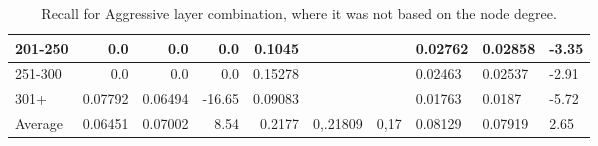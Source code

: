 \begin{table*}[]
\begin{tabular}{|l|r|r|r||r|r|r||l|l|l|}
        201-250   & 0.0                                     & 0.0                           & 0.0                              & 0.1045                     &                          &                            & 0.02762 & 0.02858 & -3.35 \\ \hline
        251-300   & 0.0                                     & 0.0                           & 0.0                              & 0.15278                    &                          &                            & 0.02463 & 0.02537 & -2.91 \\ \hline
        301+      & 0.07792                                 & 0.06494                       & -16.65                           & 0.09083                    &                          &                            & 0.01763 & 0.0187  & -5.72 \\ \hline
        Average   & 0.06451                                 & 0.07002                       & 8.54                             & 0.2177                     & 0,.21809                 & 0,17                       & 0.08129 & 0.07919 & 2.65  \\ \hline
    \end{tabular}
    \caption{Recall for Aggressive layer combination, where it was not based on the node degree.}
    \label{tab:aggressive-layer-combination-recall}
\end{table*}
